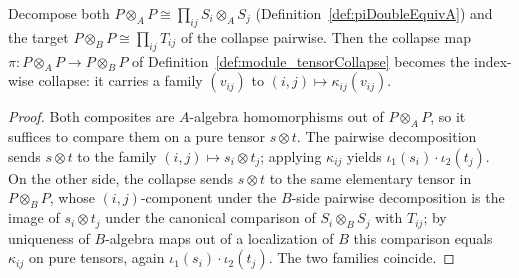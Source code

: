 \begin{lemma}
  \label{lem:piDoubleEquiv_tensorCollapse}
  \leanok
  Decompose both \(P \otimes_A P \cong \prod_{ij} S_i \otimes_A S_j\)
  (Definition~\ref{def:piDoubleEquivA}) and the target
  \(P \otimes_B P \cong \prod_{ij} T_{ij}\) of the collapse pairwise. Then the collapse map
  \(\pi \colon P \otimes_A P \to P \otimes_B P\) of
  Definition~\ref{def:module_tensorCollapse} becomes the index-wise collapse: it carries a
  family \((v_{ij})\) to \((i,j) \mapsto \kappa_{ij}(v_{ij})\).
\end{lemma}
\begin{proof}
  \leanok
  Both composites are \(A\)-algebra homomorphisms out of \(P \otimes_A P\), so it suffices to
  compare them on a pure tensor \(s \otimes t\). The pairwise decomposition sends
  \(s \otimes t\) to the family \((i,j) \mapsto s_i \otimes t_j\); applying \(\kappa_{ij}\)
  yields \(\iota_1(s_i) \cdot \iota_2(t_j)\). On the other side, the collapse sends
  \(s \otimes t\) to the same elementary tensor in \(P \otimes_B P\), whose \((i,j)\)-component
  under the \(B\)-side pairwise decomposition is the image of \(s_i \otimes t_j\) under the
  canonical comparison of \(S_i \otimes_B S_j\) with \(T_{ij}\); by uniqueness of \(B\)-algebra
  maps out of a localization of \(B\) this comparison equals \(\kappa_{ij}\) on pure tensors,
  again \(\iota_1(s_i) \cdot \iota_2(t_j)\). The two families coincide.
\end{proof}

